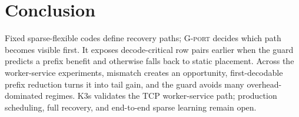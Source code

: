 \section{Conclusion}

Fixed sparse-flexible codes define recovery paths; \textsc{G-port} decides which
path becomes visible first.  It exposes decode-critical row pairs earlier when
the guard predicts a prefix benefit and otherwise falls back to static placement.
Across the worker-service experiments, mismatch creates an opportunity,
first-decodable prefix reduction turns it into tail gain, and the guard avoids
many overhead-dominated regimes.  K3s validates the TCP worker-service path;
production scheduling, full recovery, and end-to-end sparse learning remain
open.
